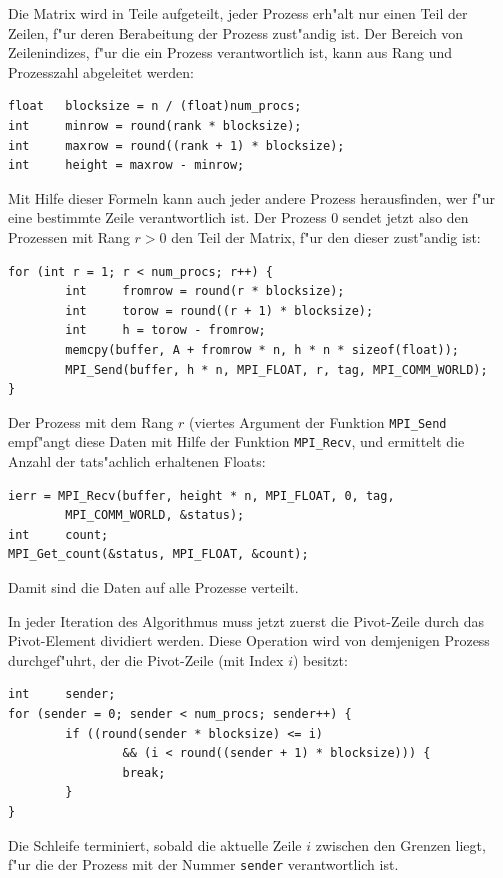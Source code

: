 Die Matrix wird in Teile aufgeteilt, jeder Prozess erh"alt nur einen
Teil der Zeilen, f"ur deren Berabeitung der Prozess zust"andig ist. 
Der Bereich von Zeilenindizes, f"ur die ein Prozess verantwortlich ist,
kann aus Rang und Prozesszahl abgeleitet werden:
\begin{verbatim}
float   blocksize = n / (float)num_procs;
int     minrow = round(rank * blocksize);
int     maxrow = round((rank + 1) * blocksize);
int     height = maxrow - minrow;
\end{verbatim}
Mit Hilfe dieser Formeln kann auch jeder andere Prozess herausfinden,
wer f"ur eine bestimmte Zeile verantwortlich ist.
Der Prozess 0 sendet jetzt also den Prozessen mit Rang $r>0$ den Teil
der Matrix, f"ur den dieser zust"andig ist:
\begin{verbatim}
for (int r = 1; r < num_procs; r++) {
        int     fromrow = round(r * blocksize);
        int     torow = round((r + 1) * blocksize);
        int     h = torow - fromrow;
        memcpy(buffer, A + fromrow * n, h * n * sizeof(float));
        MPI_Send(buffer, h * n, MPI_FLOAT, r, tag, MPI_COMM_WORLD);
}
\end{verbatim}
Der Prozess mit dem Rang $r$ (viertes Argument der Funktion
\verb+MPI_Send+ empf"angt diese Daten mit Hilfe der Funktion
\verb+MPI_Recv+, und ermittelt die Anzahl der tats"achlich erhaltenen
Floats:
\begin{verbatim}
ierr = MPI_Recv(buffer, height * n, MPI_FLOAT, 0, tag,
        MPI_COMM_WORLD, &status);
int     count;
MPI_Get_count(&status, MPI_FLOAT, &count);
\end{verbatim}
Damit sind die Daten auf alle Prozesse verteilt.

In jeder Iteration des Algorithmus muss jetzt zuerst die Pivot-Zeile
durch das Pivot-Element dividiert werden. Diese Operation wird von
demjenigen Prozess durchgef"uhrt, der die Pivot-Zeile (mit Index $i$) besitzt:
\begin{verbatim}
int     sender;
for (sender = 0; sender < num_procs; sender++) {
        if ((round(sender * blocksize) <= i)
                && (i < round((sender + 1) * blocksize))) {
                break;
        }
}
\end{verbatim}
Die Schleife terminiert, sobald die aktuelle Zeile $i$ zwischen
den Grenzen liegt, f"ur die der Prozess mit der Nummer \verb+sender+
verantwortlich ist.


